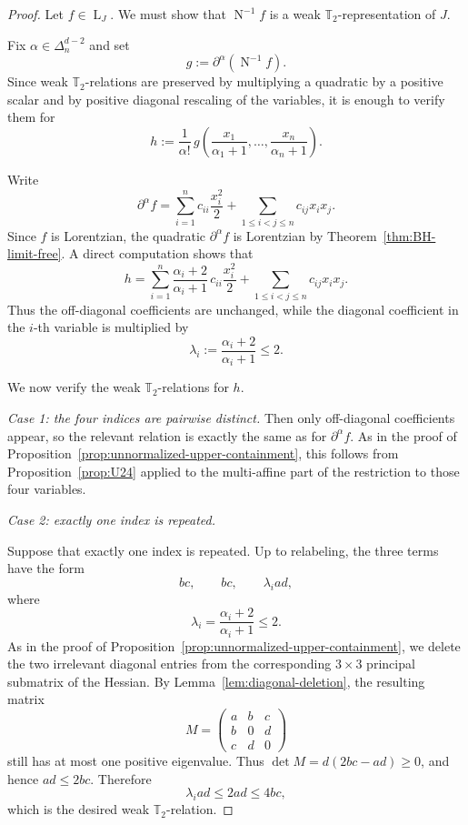 \documentclass[12pt]{amsart}
\theoremstyle{definition}
\newcommand{\1}{\mathbf{1}}
\DeclareMathOperator{\upN}{N}   %
\DeclareMathOperator{\upL}{L}   %
\newcommand\T{{\mathbb T}}
\begin{document}
\begin{proof}
Let $f\in \upL_J$. We must show that $\upN^{-1}f$ is a weak $\T_2$-representation
of $J$.

Fix $\alpha\in \Delta_n^{d-2}$ and set
\[
g:=\partial^\alpha(\upN^{-1}f).
\]
Since weak $\T_2$-relations are preserved by multiplying a quadratic by a positive scalar
and by positive diagonal rescaling of the variables, it is enough to verify them for
\[
h:=\frac{1}{\alpha!}\,
g\!\left(\frac{x_1}{\alpha_1+1},\dots,\frac{x_n}{\alpha_n+1}\right).
\]

Write
\[
\partial^\alpha f
=
\sum_{i=1}^n c_{ii}\frac{x_i^2}{2}
+
\sum_{1\le i<j\le n} c_{ij}x_i x_j.
\]
Since $f$ is Lorentzian, the quadratic $\partial^\alpha f$ is Lorentzian by
Theorem~\ref{thm:BH-limit-free}. A direct computation shows that
\[
h
=
\sum_{i=1}^n
\frac{\alpha_i+2}{\alpha_i+1}\,c_{ii}\frac{x_i^2}{2}
+
\sum_{1\le i<j\le n} c_{ij}x_i x_j.
\]
Thus the off-diagonal coefficients are unchanged, while the diagonal coefficient in the
$i$-th variable is multiplied by
\[
\lambda_i:=\frac{\alpha_i+2}{\alpha_i+1}\le 2.
\]

We now verify the weak $\T_2$-relations for $h$.

\smallskip

\emph{Case 1: the four indices are pairwise distinct.}
Then only off-diagonal coefficients appear, so the relevant relation is exactly the same as
for $\partial^\alpha f$. As in the proof of Proposition~\ref{prop:unnormalized-upper-containment},
this follows from Proposition~\ref{prop:U24} applied to the multi-affine part of
the restriction to those four variables.

\smallskip

\emph{Case 2: exactly one index is repeated.}

Suppose that exactly one index is repeated.  Up to relabeling, the three terms
have the form
\[
bc,\qquad bc,\qquad \lambda_i ad,
\]
where
\[
\lambda_i=\frac{\alpha_i+2}{\alpha_i+1}\le 2.
\]
As in the proof of Proposition~\ref{prop:unnormalized-upper-containment},
we delete the two irrelevant diagonal entries from the corresponding
$3\times 3$ principal submatrix of the Hessian.  By
Lemma~\ref{lem:diagonal-deletion}, the resulting matrix
\[
M=
\begin{pmatrix}
a & b & c\\
b & 0 & d\\
c & d & 0
\end{pmatrix}
\]
still has at most one positive eigenvalue.  Thus $\det M=d(2bc-ad)\ge 0$,
and hence $ad\le 2bc$.  Therefore
\[
\lambda_i ad\le 2ad\le 4bc,
\]
which is the desired weak $\T_2$-relation.
\smallskip


\end{proof}
\end{document}
